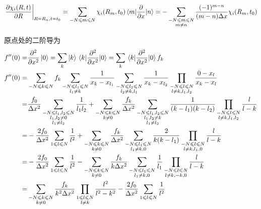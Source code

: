 \documentclass[UTF8,12pt]{article}
\begin{document}
        \begin{equation}
            \eval{\pdv{\chi_i(R,t)}{R}}_{R=R_n,t=t_0}=\sum_{-N\leqslant m\leqslant N}{\chi_i(R_m,t_0)\mel{m}{\pdv{x}}{n}}=-\sum_{\substack{-N\leqslant m\leqslant N\\m\neq n}}{\frac{(-1)^{m-n}}{(m-n)\Delta x}\chi_i(R_m,t_0)}
        \end{equation}\par
        原点处的二阶导为
        \begin{align}
            f''(0)=&\pdv[2]{x}\ket{0}=\sum_k{\ket{k}\mel{k}{\pdv[2]{x}}{0}}=\sum_k{\mel{k}{\pdv[2]{x}}{0}f_k} \\
            f''(0)=&\sum_{-N\leqslant k\leqslant N}{f_k\sum_{\substack{-N\leqslant l_1\leqslant N\\l_1\neq k}}{\frac{1}{x_k-x_{l_1}}\sum_{\substack{-N\leqslant l_2\leqslant N\\l_2\neq k,l_1}}{\frac{1}{x_k-x_{l_2}}\prod_{\substack{-N\leqslant l\leqslant N\\l\neq k,l_1,l_2}}{\frac{0-x_l}{x_k-x_l}}}}} \\
            =&\frac{f_0}{\Delta x^2}\sum_{\substack{-N\leqslant l_1,l_2\leqslant N\\l_1,l_2\neq 0\\l_1\neq l_2}}{\frac{1}{l_1l_2}}+\sum_{\substack{-N\leqslant k\leqslant N\\k\neq0}}{\frac{f_k}{\Delta x^2}\sum_{\substack{-N\leqslant l_1,l_2\leqslant N\\l_1,l_2\neq k\\l_1\neq l_2}}{\frac{1}{(k-l_1)(k-l_2)}\prod_{\substack{-N\leqslant l\leqslant N\\l\neq k,l_1,l_2}}{\frac{l}{l-k}}}} \\
            =&-\frac{2f_0}{\Delta x^2}\sum_{1\leqslant l\leqslant N}{\frac{1}{l^2}}+\sum_{\substack{-N\leqslant k\leqslant N\\k\neq0}}{\frac{f_k}{\Delta x^2}\sum_{\substack{-N\leqslant l_1\leqslant N\\l_1\neq k,0}}{\frac{2}{k(k-l_1)}\prod_{\substack{-N\leqslant l\leqslant N\\l\neq k,l_1,0}}{\frac{l}{l-k}}}} \\
            =&-\frac{2f_0}{\Delta x^2}\sum_{1\leqslant l\leqslant N}{\frac{1}{l^2}}-\sum_{\substack{-N\leqslant k\leqslant N\\k\neq0}}{\frac{f_k}{k\Delta x^2}\sum_{\substack{-N\leqslant l_1\leqslant N\\l_1\neq k,0}}{\frac{1}{l_1}\prod_{\substack{-N\leqslant l\leqslant N\\l\neq k,-k,0}}{\frac{l}{l-k}}}} \\
            =&\sum_{\substack{-N\leqslant k\leqslant N\\k\neq0}}{\frac{f_k}{k^2\Delta x^2}\prod_{\substack{1\leqslant l\leqslant N\\l\neq k}}{\frac{l^2}{l^2-k^2}}}-\frac{2f_0}{\Delta x^2}\sum_{1\leqslant l\leqslant N}{\frac{1}{l^2}}
        \end{align}
\end{document}
